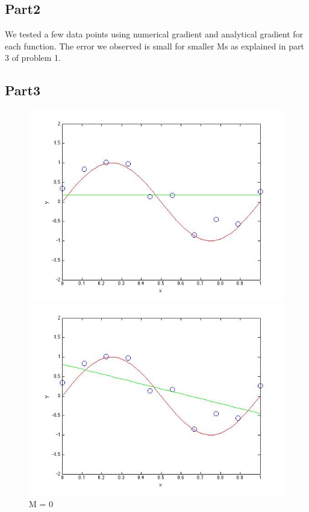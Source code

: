 \subsection{Part2}

We tested a few data points using numerical gradient and analytical gradient for each function.
The error we observed is small for smaller Ms as explained in part 3 of problem 1. 

\subsection{Part3}

\begin{figure}[!htb]
  \includegraphics[width=\linewidth]{figures/p2_M=0}
  \caption{M = 0}\label{fig:figures/p2_M=0}
\endminipage\hfill
{}
  \includegraphics[width=\linewidth]{figures/p2_M=1}

\end{figure}
